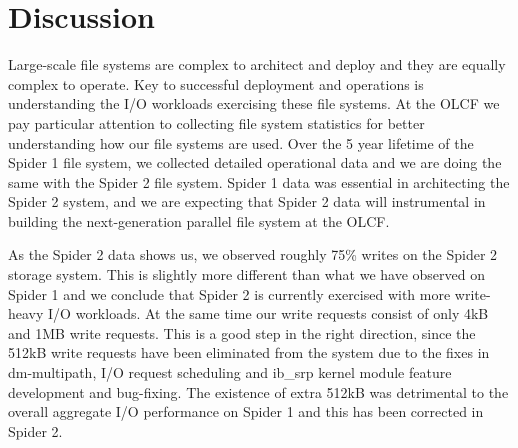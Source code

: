 \section{Discussion}
\label{sec:discuss} 

Large-scale file systems are complex to architect and deploy and they are
equally complex to operate. Key to successful deployment and operations is
understanding the I/O workloads exercising these file systems. At the OLCF we
pay particular attention to collecting file system statistics for better
understanding how our file systems are used. Over the 5 year lifetime of the
Spider 1 file system, we collected detailed operational data and we are doing
the same with the Spider 2 file system. Spider 1 data was essential in
architecting the Spider 2 system, and we are expecting that Spider 2 data will
instrumental in building the next-generation parallel file system at the OLCF.
 

As the Spider 2 data shows us, we observed roughly 75\% writes on the Spider 2
storage system. This is slightly more different than what we have observed on
Spider 1 and we conclude that Spider 2 is currently exercised with more
write-heavy I/O workloads. At the same time our write requests consist of only
4kB and 1MB write requests. This is a good step in the right direction, since
the 512kB write requests have been eliminated from the system due to the fixes 
in dm-multipath, I/O request scheduling and ib\_srp kernel module feature 
development and bug-fixing. The existence of extra 512kB was detrimental to the
overall aggregate I/O performance on Spider 1 and this has been corrected in
Spider 2.  
